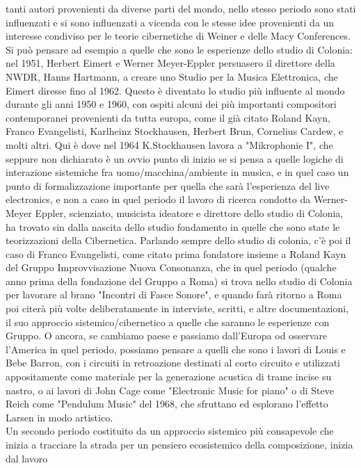 tanti autori provenienti da diverse parti del mondo, nello stesso periodo
sono stati influenzati e si sono influenzati a vicenda con le stesse idee
provenienti da un interesse condiviso per le teorie cibernetiche di Weiner e delle Macy Conferences.
Si può pensare ad esempio a quelle che sono le esperienze dello studio di Colonia:
nel 1951, Herbert Eimert e Werner Meyer-Eppler persuasero il direttore della NWDR, Hanns Hartmann,
a creare uno Studio per la Musica Elettronica, che Eimert diresse fino al 1962.
Questo è diventato lo studio più influente al mondo durante gli anni 1950 e 1960,
con ospiti alcuni dei più importanti compositori contemporanei provenienti da tutta europa,
come il già citato Roland Kayn, Franco Evangelisti, Karlheinz Stockhausen, Herbert Brun,
Cornelius Cardew, e molti altri.
Qui è dove nel 1964 K.Stockhausen lavora a "Mikrophonie I", che seppure non dichiarato è un ovvio punto di inizio
se si pensa a quelle logiche di interazione sistemiche fra uomo/macchina/ambiente in musica,
e in quel caso un punto di formalizzazione importante per quella che sarà l'esperienza del live electronics,
e non a caso in quel periodo il lavoro di ricerca condotto da Werner-Meyer Eppler,
scienziato, musicista ideatore e direttore dello studio di Colonia,
ha trovato sin dalla nascita dello studio fondamento in quelle che sono state
le teorizzazioni della Cibernetica.
Parlando sempre dello studio di colonia, c'è poi il caso di Franco Evangelisti,
come citato prima fondatore insieme a Roland Kayn del Gruppo Improvvisazione Nuova Consonanza,
che in quel periodo (qualche anno prima della fondazione del Gruppo a Roma)
si trova nello studio di Colonia per lavorare al brano "Incontri di Fasce Sonore",
e quando farà ritorno a Roma poi citerà più volte deliberatamente in interviste, scritti,
e altre documentazioni, il suo approccio sistemico/cibernetico a quelle che saranno le esperienze con
Gruppo.
O ancora, se cambiamo paese e passiamo dall'Europa od osservare l'America in quel periodo,
possiamo pensare a quelli che sono i lavori di Louis e Bebe Barron,
con i circuiti in retroazione destinati al corto circuito
e utilizzati appositamente come materiale per la generazione acustica di trame incise su nastro,
o ai lavori di John Cage come "Electronic Music for piano" o di Steve Reich come "Pendulum Music" del 1968,
che sfruttano ed esplorano l'effetto Larsen in modo artistico.
\\
Un secondo periodo costituito da un approccio sistemico più consapevole
che inizia a tracciare la strada per un pensiero ecosistemico della composizione, inizia dal lavoro
